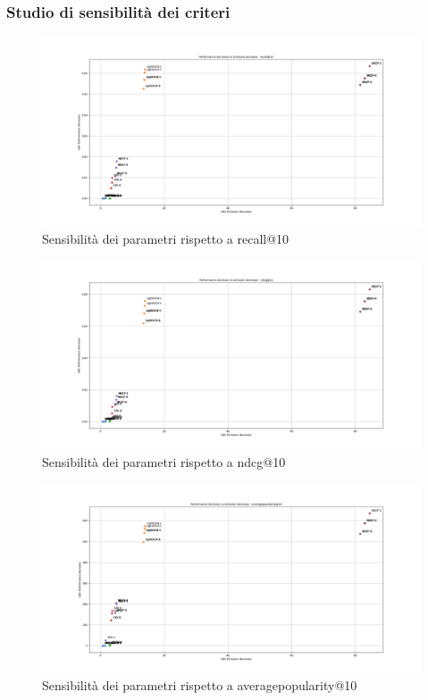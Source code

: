 \subsubsection{Studio di sensibilità dei criteri}

\begin{figure}[H]
    \includegraphics[width=\textwidth]{images/sensibility_recall@10.png}
    \caption{Sensibilità dei parametri rispetto a recall@10}
\end{figure}

\begin{figure}[H]
    \includegraphics[width=\textwidth]{images/sensibility_ndcg@10.png}
    \caption{Sensibilità dei parametri rispetto a ndcg@10}
\end{figure}

\begin{figure}[H]
    \includegraphics[width=\textwidth]{images/sensibility_averagepopularity@10.png}
    \caption{Sensibilità dei parametri rispetto a averagepopularity@10}
\end{figure}

